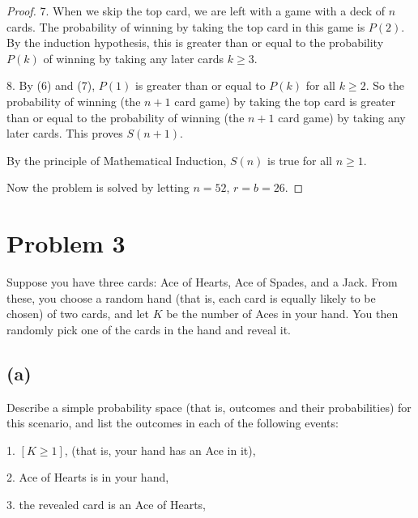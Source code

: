 \documentclass[14pt]{extarticle}
\begin{document}
\begin{proof}
7. When we skip the top card, we are left with a game with a deck of $n$ cards. The probability of winning by taking the top card in this game is $P(2)$. By the induction hypothesis, this is greater than or equal to the probability $P(k)$ of winning by taking any later cards $k \geq 3$.

8. By (6) and (7), $P(1)$ is greater than or equal to $P(k)$ for all $k \geq 2$. So the probability of winning (the $n+1$ card game) by taking the top card is greater than or equal to the probability of winning (the $n+1$ card game) by taking any later cards. This proves $S(n+1)$.

By the principle of Mathematical Induction, $S(n)$ is true for all $n \geq 1$.

Now the problem is solved by letting $n = 52$, $r = b = 26$.
\end{proof}

\section{Problem 3}
Suppose you have three cards: Ace of Hearts, Ace of Spades, and a Jack. From these, you choose a random hand (that is, each card is equally likely to be chosen) of two cards, and let $K$ be the number of Aces in your hand. You then randomly pick one of the cards in the hand and reveal it.
\subsection{(a)}
Describe a simple probability space (that is, outcomes and their probabilities) for this scenario, and list the outcomes in each of the following events:

1. $[K \geq 1]$, (that is, your hand has an Ace in it),

2. Ace of Hearts is in your hand,

3. the revealed card is an Ace of Hearts,
\end{document}
